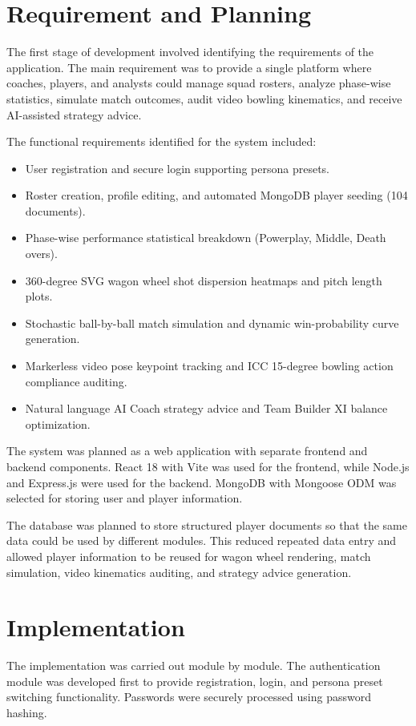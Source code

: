 \section{Requirement and Planning}
The first stage of development involved identifying the requirements of the application. The main requirement was to provide a single platform where coaches, players, and analysts could manage squad rosters, analyze phase-wise statistics, simulate match outcomes, audit video bowling kinematics, and receive AI-assisted strategy advice.

The functional requirements identified for the system included:
\begin{itemize}
    \item User registration and secure login supporting persona presets.
    \item Roster creation, profile editing, and automated MongoDB player seeding (104 documents).
    \item Phase-wise performance statistical breakdown (Powerplay, Middle, Death overs).
    \item 360-degree SVG wagon wheel shot dispersion heatmaps and pitch length plots.
    \item Stochastic ball-by-ball match simulation and dynamic win-probability curve generation.
    \item Markerless video pose keypoint tracking and ICC 15-degree bowling action compliance auditing.
    \item Natural language AI Coach strategy advice and Team Builder XI balance optimization.
\end{itemize}

The system was planned as a web application with separate frontend and backend components. React 18 with Vite was used for the frontend, while Node.js and Express.js were used for the backend. MongoDB with Mongoose ODM was selected for storing user and player information.

The database was planned to store structured player documents so that the same data could be used by different modules. This reduced repeated data entry and allowed player information to be reused for wagon wheel rendering, match simulation, video kinematics auditing, and strategy advice generation.

\section{Implementation}
The implementation was carried out module by module. The authentication module was developed first to provide registration, login, and persona preset switching functionality. Passwords were securely processed using password hashing.


